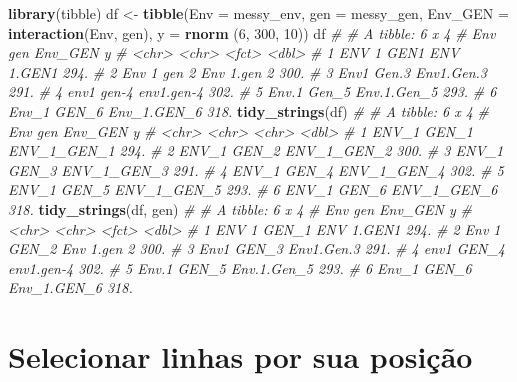 \documentclass[
]{book}
\newenvironment{Shaded}{\begin{snugshade}}{\end{snugshade}}
\newcommand{\CommentTok}[1]{\textcolor[rgb]{0.56,0.35,0.01}{\textit{#1}}}
\newcommand{\DataTypeTok}[1]{\textcolor[rgb]{0.13,0.29,0.53}{#1}}
\newcommand{\DecValTok}[1]{\textcolor[rgb]{0.00,0.00,0.81}{#1}}
\newcommand{\KeywordTok}[1]{\textcolor[rgb]{0.13,0.29,0.53}{\textbf{#1}}}
\newcommand{\NormalTok}[1]{#1}
\newcommand{\StringTok}[1]{\textcolor[rgb]{0.31,0.60,0.02}{#1}}
\numberwithin{equation}{section}
\begin{document}
\begin{Shaded}
\begin{Highlighting}[]
\KeywordTok{library}\NormalTok{(tibble)}
\NormalTok{df \textless{}{-}}\StringTok{ }\KeywordTok{tibble}\NormalTok{(}\DataTypeTok{Env =}\NormalTok{ messy\_env,}
             \DataTypeTok{gen =}\NormalTok{ messy\_gen,}
             \DataTypeTok{Env\_GEN =} \KeywordTok{interaction}\NormalTok{(Env, gen),}
             \DataTypeTok{y =} \KeywordTok{rnorm}\NormalTok{ (}\DecValTok{6}\NormalTok{, }\DecValTok{300}\NormalTok{, }\DecValTok{10}\NormalTok{))}
\NormalTok{df}
\CommentTok{\# \# A tibble: 6 x 4}
\CommentTok{\#   Env   gen   Env\_GEN         y}
\CommentTok{\#   \textless{}chr\textgreater{} \textless{}chr\textgreater{} \textless{}fct\textgreater{}       \textless{}dbl\textgreater{}}
\CommentTok{\# 1 ENV 1 GEN1  ENV 1.GEN1   294.}
\CommentTok{\# 2 Env 1 gen 2 Env 1.gen 2  300.}
\CommentTok{\# 3 Env1  Gen.3 Env1.Gen.3   291.}
\CommentTok{\# 4 env1  gen{-}4 env1.gen{-}4   302.}
\CommentTok{\# 5 Env.1 Gen\_5 Env.1.Gen\_5  293.}
\CommentTok{\# 6 Env\_1 GEN\_6 Env\_1.GEN\_6  318.}
\KeywordTok{tidy\_strings}\NormalTok{(df)}
\CommentTok{\# \# A tibble: 6 x 4}
\CommentTok{\#   Env   gen   Env\_GEN         y}
\CommentTok{\#   \textless{}chr\textgreater{} \textless{}chr\textgreater{} \textless{}chr\textgreater{}       \textless{}dbl\textgreater{}}
\CommentTok{\# 1 ENV\_1 GEN\_1 ENV\_1\_GEN\_1  294.}
\CommentTok{\# 2 ENV\_1 GEN\_2 ENV\_1\_GEN\_2  300.}
\CommentTok{\# 3 ENV\_1 GEN\_3 ENV\_1\_GEN\_3  291.}
\CommentTok{\# 4 ENV\_1 GEN\_4 ENV\_1\_GEN\_4  302.}
\CommentTok{\# 5 ENV\_1 GEN\_5 ENV\_1\_GEN\_5  293.}
\CommentTok{\# 6 ENV\_1 GEN\_6 ENV\_1\_GEN\_6  318.}
\KeywordTok{tidy\_strings}\NormalTok{(df, gen)}
\CommentTok{\# \# A tibble: 6 x 4}
\CommentTok{\#   Env   gen   Env\_GEN         y}
\CommentTok{\#   \textless{}chr\textgreater{} \textless{}chr\textgreater{} \textless{}fct\textgreater{}       \textless{}dbl\textgreater{}}
\CommentTok{\# 1 ENV 1 GEN\_1 ENV 1.GEN1   294.}
\CommentTok{\# 2 Env 1 GEN\_2 Env 1.gen 2  300.}
\CommentTok{\# 3 Env1  GEN\_3 Env1.Gen.3   291.}
\CommentTok{\# 4 env1  GEN\_4 env1.gen{-}4   302.}
\CommentTok{\# 5 Env.1 GEN\_5 Env.1.Gen\_5  293.}
\CommentTok{\# 6 Env\_1 GEN\_6 Env\_1.GEN\_6  318.}
\end{Highlighting}
\end{Shaded}

\hypertarget{selecionar-linhas-por-sua-posiuxe7uxe3o}{%
\section{Selecionar linhas por sua posição}\label{selecionar-linhas-por-sua-posiuxe7uxe3o}}
\end{document}
